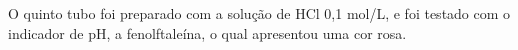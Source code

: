 \begin{figure}[h]
            \label{fig:experimento13}
        \end{figure}

        \newpage

        \indent O quinto tubo foi preparado com a solução de HCl 0,1 mol/L, e foi testado com o indicador de pH, a fenolftaleína, o qual apresentou uma cor rosa.

